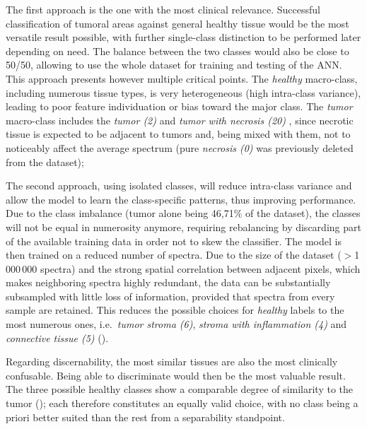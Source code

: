The first approach is the one with the most clinical relevance. Successful classification of tumoral areas against general healthy tissue would be the most versatile result possible, with further single-class distinction to be performed later depending on need. The balance between the two classes would also be close to 50/50, allowing to use the whole dataset for training and testing of the ANN. This approach presents however multiple critical points.
The \textit{healthy} macro-class, including numerous tissue types, is very heterogeneous (high intra-class variance), leading to poor feature individuation or bias toward the major class.
The \textit{tumor} macro-class includes the \textit{tumor (2)} and \textit{tumor with necrosis (20)} , since necrotic tissue is expected to be adjacent to tumors and, being mixed with them, not to noticeably affect the average spectrum (pure \textit{necrosis (0)} was previously deleted from the dataset);


The second approach, using isolated classes, will reduce intra-class variance and allow the model to learn the class-specific patterns, thus improving performance.
Due to the class imbalance (tumor alone being 46,71\% of the dataset), the classes will not be equal in numerosity anymore, requiring rebalancing by discarding part of the available training data in order not to skew the classifier. The model is then trained on a reduced number of spectra. Due to the size of the dataset ($>$1\,000\,000 spectra) and the strong spatial correlation between adjacent pixels, which makes neighboring spectra highly redundant, the data can be substantially subsampled with little loss of information, provided that spectra from every sample are retained. This reduces the possible choices for \textit{healthy} labels to the most numerous ones, i.e.\ \textit{tumor stroma (6)}, \textit{stroma with inflammation (4)} and \textit{connective tissue (5)} ().

Regarding discernability, the most similar tissues are also the most clinically confusable. Being able to discriminate would then be the most valuable result. The three possible healthy classes show a comparable degree of similarity to the tumor (); each therefore constitutes an equally valid choice, with no class being a priori better suited than the rest from a separability standpoint.

